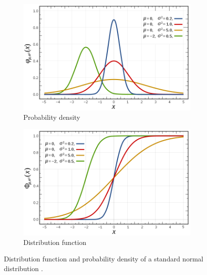 \begin{figure}[h]
\centering
\begin{subfigure}{.5\textwidth}
  \centering
  \includegraphics[width=\linewidth]{images/Gaussiane/PDFNormalDistribution.png}
  \caption{Probability density}
  \label{fig:sub1}
\end{subfigure}%
\begin{subfigure}{.5\textwidth}
  \centering
  \includegraphics[width=\linewidth]{images/Gaussiane/CDFNormalDistribution.png}
  \caption{Distribution function}
  \label{fig:sub2}
\end{subfigure}
\caption{Distribution function and probability density of a standard normal distribution \cite{wikiNormalDistribution}.}
\label{fig:gaussian}
\end{figure}



